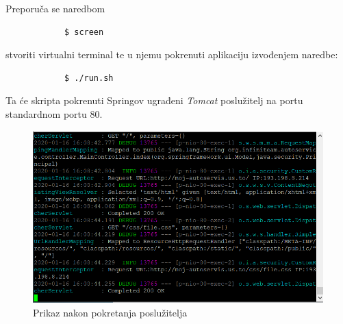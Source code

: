		
		Preporuča se naredbom 
		\begin{lstlisting}
			$ screen
		\end{lstlisting}
		stvoriti virtualni terminal te u njemu pokrenuti aplikaciju izvođenjem naredbe:
		\begin{lstlisting}
			$ ./run.sh
		\end{lstlisting}
		Ta će skripta pokrenuti Springov ugrađeni \textit{Tomcat} poslužitelj na portu standardnom portu 80.
		
		\begin{figure}[h]
			\centering
			\includegraphics[width=1.0\linewidth]{slike/deployment2}
			\caption{Prikaz nakon pokretanja poslužitelja}
			\label{fig:deployment2}
		\end{figure}
		
			
			\eject 